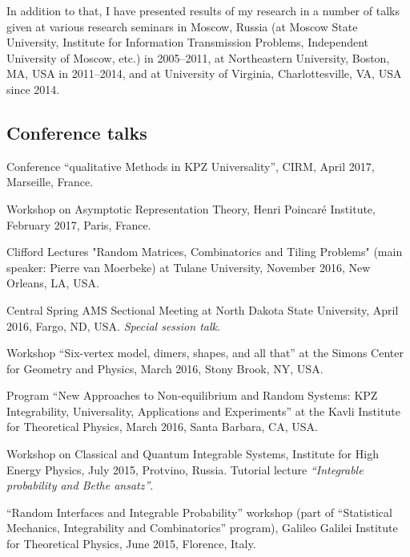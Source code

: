 \documentclass[letterpaper,11pt]{article}
\begin{document}
In addition to that, I have presented results of my research in a number of talks given at various research seminars in Moscow, Russia (at Moscow State University, Institute for Information Transmission Problems, Independent University of Moscow, etc.) in 2005--2011, at Northeastern University, Boston, MA, USA in 2011--2014, and
at University of Virginia, Charlottesville, VA, USA since 2014.

\subsection*{Conference talks}

\begin{etaremune}
\item 
	Conference ``qualitative Methods in KPZ Universality'', CIRM, 
	April 2017,
	Marseille, France. 

\item 
	Workshop on Asymptotic Representation Theory, Henri Poincar\'e Institute, February 2017, Paris, France.

\item Clifford Lectures 
	"Random Matrices, Combinatorics and Tiling Problems" 
	(main speaker: Pierre van Moerbeke) at Tulane University, 
	November 2016, New Orleans, LA, USA.

\item Central Spring AMS Sectional Meeting 
at 
North Dakota State University, April 2016, 
Fargo, ND, USA. \emph{Special session talk}.

\item 
Workshop 
``Six-vertex model, dimers, shapes, and all that''
at the
Simons Center for Geometry and Physics,
March 2016, Stony Brook, NY, USA.

\item 
Program ``New Approaches to Non-equilibrium and Random Systems: 
KPZ Integrability, Universality, Applications and Experiments''
at the Kavli Institute for Theoretical Physics, 
March 2016, Santa Barbara, CA, USA.

\item Workshop on Classical and Quantum Integrable Systems, 
Institute for High Energy Physics, July 2015, Protvino, Russia.
Tutorial lecture \emph{``Integrable probability and Bethe ansatz''}.

\item 
``Random Interfaces and Integrable Probability'' workshop (part of 
``Statistical Mechanics, Integrability and Combinatorics'' program), 
Galileo Galilei Institute for Theoretical Physics, June 2015, Florence, Italy.


\end{etaremune}
\end{document}
